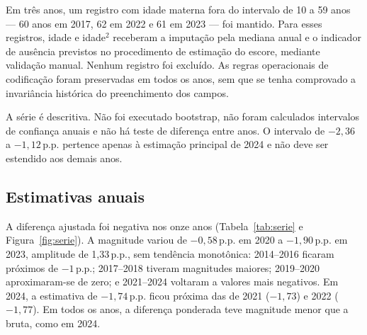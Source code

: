 \documentclass[11pt,a4paper]{article}
\newcommand{\pp}{\,p.p.}
\begin{document}
Em três anos, um registro com idade materna fora do intervalo de 10 a 59 anos --- 60
anos em 2017, 62 em 2022 e 61 em 2023 --- foi mantido. Para esses registros, idade e
idade$^2$ receberam a imputação pela mediana anual e o indicador de ausência previstos no
procedimento de estimação do escore, mediante validação manual. Nenhum registro foi
excluído. As regras operacionais de codificação foram preservadas em todos os anos, sem
que se tenha comprovado a invariância histórica do preenchimento dos campos.

A série é descritiva. Não foi executado bootstrap, não foram calculados intervalos de
confiança anuais e não há teste de diferença entre anos. O intervalo de $-2{,}36$ a
$-1{,}12$\pp{} pertence apenas à estimação principal de 2024 e não deve ser estendido aos
demais anos.

\subsection{Estimativas anuais}

A diferença ajustada foi negativa nos onze anos (Tabela~\ref{tab:serie} e
Figura~\ref{fig:serie}). A magnitude variou de $-0{,}58$\pp{} em 2020 a $-1{,}90$\pp{} em
2023, amplitude de 1,33\pp, sem tendência monotônica: 2014--2016 ficaram próximos de
$-1$\pp; 2017--2018 tiveram magnitudes maiores; 2019--2020 aproximaram-se de zero; e
2021--2024 voltaram a valores mais negativos. Em 2024, a estimativa de $-1{,}74$\pp{}
ficou próxima das de 2021 ($-1{,}73$) e 2022 ($-1{,}77$). Em todos os anos, a diferença
ponderada teve magnitude menor que a bruta, como em 2024.
\end{document}
